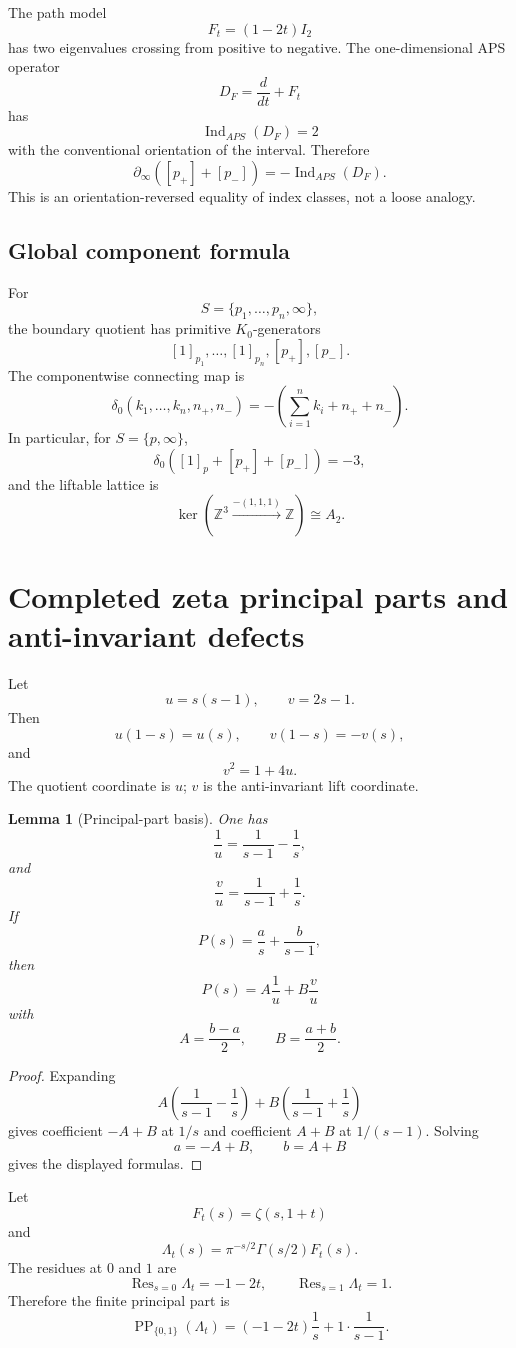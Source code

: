 \documentclass[11pt]{article}
\newtheorem{lemma}[theorem]{Lemma}
\DeclareMathOperator{\Res}{Res}
\newcommand{\ZZ}{\mathbb Z}
\begin{document}
The path model
\[
        F_t=(1-2t)I_2
\]
has two eigenvalues crossing from positive to negative.  The one-dimensional APS operator
\[
        D_F=\frac d{dt}+F_t
\]
has
\[
        \operatorname{Ind}_{APS}(D_F)=2
\]
with the conventional orientation of the interval.  Therefore
\[
        \partial_\infty([p_+]+[p_-])=-\operatorname{Ind}_{APS}(D_F).
\]
This is an orientation-reversed equality of index classes, not a loose analogy.

\subsection{Global component formula}

For
\[
        S=\{p_1,\ldots,p_n,\infty\},
\]
the boundary quotient has primitive $K_0$-generators
\[
        [1]_{p_1},\ldots,[1]_{p_n},[p_+],[p_-].
\]
The componentwise connecting map is
\[
        \delta_0(k_1,\ldots,k_n,n_+,n_-)
        =-
        \left(\sum_{i=1}^n k_i+n_++n_-\right).
\]
In particular, for $S=\{p,\infty\}$,
\[
        \delta_0([1]_p+[p_+]+[p_-])=-3,
\]
and the liftable lattice is
\[
        \ker(\ZZ^3\xrightarrow{-(1,1,1)}\ZZ)\cong A_2.
\]

\section{Completed zeta principal parts and anti-invariant defects}

Let
\[
        u=s(s-1),\qquad v=2s-1.
\]
Then
\[
        u(1-s)=u(s),\qquad v(1-s)=-v(s),
\]
and
\[
        v^2=1+4u.
\]
The quotient coordinate is $u$; $v$ is the anti-invariant lift coordinate.

\begin{lemma}[Principal-part basis]
One has
\[
        \frac1u=\frac1{s-1}-\frac1s,
\]
and
\[
        \frac vu=\frac1{s-1}+\frac1s.
\]
If
\[
        P(s)=\frac a s+\frac b{s-1},
\]
then
\[
        P(s)=A\frac1u+B\frac vu
\]
with
\[
        A=\frac{b-a}{2},
        \qquad
        B=\frac{a+b}{2}.
\]
\end{lemma}

\begin{proof}
Expanding
\[
        A\left(\frac1{s-1}-\frac1s\right)+B\left(\frac1{s-1}+\frac1s\right)
\]
gives coefficient $-A+B$ at $1/s$ and coefficient $A+B$ at $1/(s-1)$.  Solving
\[
        a=-A+B,
        \qquad b=A+B
\]
gives the displayed formulas.
\end{proof}

Let
\[
        F_t(s)=\zeta(s,1+t)
\]
and
\[
        \Lambda_t(s)=\pi^{-s/2}\Gamma(s/2)F_t(s).
\]
The residues at $0$ and $1$ are
\[
        \Res_{s=0}\Lambda_t=-1-2t,
        \qquad
        \Res_{s=1}\Lambda_t=1.
\]
Therefore the finite principal part is
\[
        \operatorname{PP}_{\{0,1\}}(\Lambda_t)
        =(-1-2t)\frac1s+1\cdot\frac1{s-1}.
\]
\end{document}
